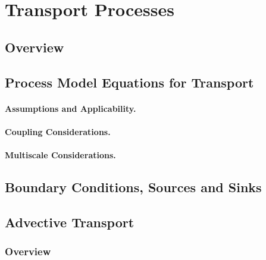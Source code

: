 %
%
%

\section{Transport Processes}    
\label{sec:Transport}

\subsection{Overview}

\subsection{Process Model Equations for Transport} 
\label{sec:general-transport}

\paragraph{Assumptions and Applicability.}

\paragraph{Coupling Considerations.}

\paragraph{Multiscale Considerations.}

\subsection{Boundary Conditions, Sources and Sinks} 
\label{sec:transport-boundary-conditions}

\subsection{Advective Transport}  
\label{sec:transport-advection}

\subsubsection{Overview} 

